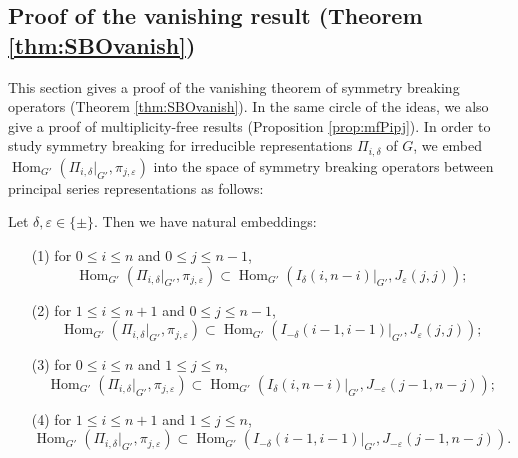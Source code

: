 \subsection{Proof of the vanishing result (Theorem \ref{thm:SBOvanish})}
\label{subsec:Pfvanish}
This section gives a proof of the vanishing theorem
 of symmetry breaking operators (Theorem \ref{thm:SBOvanish}).  
In the same circle of the ideas,
 we also give a proof of multiplicity-free results
 (Proposition \ref{prop:mfPipj}).  
In order to study symmetry breaking for irreducible representations
 $\Pi_{i,\delta}$ of $G$, 
 we embed 
$
   {\operatorname{Hom}}_{G'}(\Pi_{i,\delta}|_{G'}, \pi_{j,\varepsilon})
$
 into the space of symmetry breaking operators
 between principal series representations
 as follows:
\begin{lemma}
\label{lem:170519}
Let $\delta, \varepsilon \in \{\pm\}$.  
Then we have natural embeddings:
\begin{enumerate}
\item[{\rm{(1)}}]
for $0 \le i \le n$ and $0 \le j \le n-1$, 
\begin{equation}
{\operatorname{Hom}}_{G'}(\Pi_{i,\delta}|_{G'}, \pi_{j,\varepsilon})
\subset
{\operatorname{Hom}}_{G'}(I_{\delta}(i,n-i)|_{G'}, J_{\varepsilon}(j,j));
\label{eqn:PpIJ1}
\end{equation}
\item[{\rm{(2)}}]
for $1 \le i \le n+1$ and $0 \le j \le n-1$, 
\begin{equation}
{\operatorname{Hom}}_{G'}(\Pi_{i,\delta}|_{G'}, \pi_{j,\varepsilon})
\subset
{\operatorname{Hom}}_{G'}(I_{-\delta}(i-1,i-1)|_{G'}, J_{\varepsilon}(j,j));
\label{eqn:PpIJ2}
\end{equation}
\item[{\rm{(3)}}]
for $0 \le i \le n$ and $1 \le j \le n$,
\begin{equation}
{\operatorname{Hom}}_{G'}(\Pi_{i,\delta}|_{G'}, \pi_{j,\varepsilon})
\subset
{\operatorname{Hom}}_{G'}(I_{\delta}(i,n-i)|_{G'}, J_{-\varepsilon}(j-1,n-j)); 
\label{eqn:PpIJ3}
\end{equation}
\item[{\rm{(4)}}]
for $1 \le i \le n+1$ and $1 \le j \le n$, 
\begin{equation}
{\operatorname{Hom}}_{G'}(\Pi_{i,\delta}|_{G'}, \pi_{j,\varepsilon})
\subset
{\operatorname{Hom}}_{G'}(I_{-\delta}(i-1,i-1)|_{G'}, J_{-\varepsilon}(j-1,n-j)).  
\label{eqn:PpIJ4}
\end{equation}
\end{enumerate}
\end{lemma}
